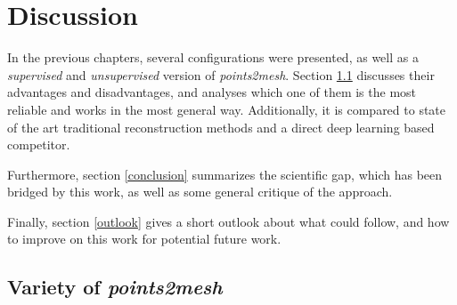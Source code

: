 \chapter{Discussion}
\label{chap:discussion}
In the previous chapters, several configurations were presented, as well as a \emph{supervised} and \emph{unsupervised} 
version of \emph{points2mesh}. Section \ref{pioneer} discusses their advantages and disadvantages, and analyses which one of them is the most reliable
 and works in the most general way. Additionally, it is compared to state of the art traditional reconstruction methods and a direct deep learning 
 based competitor.

Furthermore, section \ref{conclusion} summarizes the scientific gap, which has been bridged by this work, as well as 
some general critique of the approach.

Finally, section \ref{outlook} gives a short outlook about what could follow, and how to improve on this work for potential 
future work.

\section{Variety of \emph{points2mesh}}
\label{pioneer}

